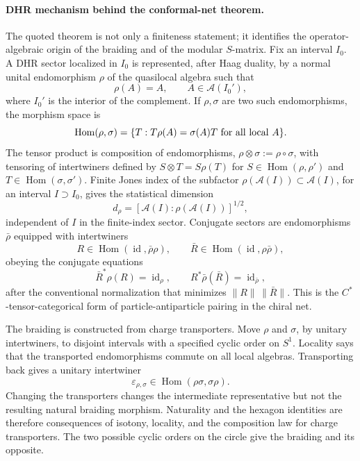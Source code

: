 \paragraph{DHR mechanism behind the conformal-net theorem.}
The quoted theorem is not only a finiteness statement; it identifies the
operator-algebraic origin of the braiding and of the modular \(S\)-matrix.
Fix an interval \(I_0\).  A DHR sector localized in \(I_0\) is represented,
after Haag duality, by a normal unital endomorphism \(\rho\) of the
quasilocal algebra such that
\begin{equation}
  \rho(A)=A,\qquad A\in\mathcal A(I_0'),
  \label{eq:dhr-localized-endomorphism}
\end{equation}
where \(I_0'\) is the interior of the complement.  If \(\rho,\sigma\) are
two such endomorphisms, the morphism space is
\begin{equation}
  \operatorname{Hom}(\rho,\sigma)
  =
  \{T:T\rho(A)=\sigma(A)T\ {\rm for\ all\ local}\ A\}.
  \label{eq:dhr-intertwiner-space}
\end{equation}
The tensor product is composition of endomorphisms,
\(\rho\otimes\sigma:=\rho\circ\sigma\), with tensoring of intertwiners
defined by \(S\otimes T=S\rho(T)\) for
\(S\in\operatorname{Hom}(\rho,\rho')\) and
\(T\in\operatorname{Hom}(\sigma,\sigma')\).  Finite Jones index of the
subfactor \(\rho(\mathcal A(I))\subset\mathcal A(I)\), for an interval
\(I\supset I_0\), gives the statistical dimension
\begin{equation}
  d_\rho
  =
  [\mathcal A(I):\rho(\mathcal A(I))]^{1/2},
  \label{eq:dhr-statistical-dimension-index}
\end{equation}
independent of \(I\) in the finite-index sector.  Conjugate sectors are
endomorphisms \(\bar\rho\) equipped with intertwiners
\[
  R\in\operatorname{Hom}(\operatorname{id},\bar\rho\rho),
  \qquad
  \bar R\in\operatorname{Hom}(\operatorname{id},\rho\bar\rho),
\]
obeying the conjugate equations
\begin{equation}
  \bar R^*\rho(R)=\operatorname{id}_\rho,
  \qquad
  R^*\bar\rho(\bar R)=\operatorname{id}_{\bar\rho},
  \label{eq:dhr-conjugate-equations}
\end{equation}
after the conventional normalization that minimizes
\(\|R\|\,\|\bar R\|\).  This is the \(C^*\)-tensor-categorical form of
particle-antiparticle pairing in the chiral net.

The braiding is constructed from charge transporters.  Move \(\rho\) and
\(\sigma\), by unitary intertwiners, to disjoint intervals with a specified
cyclic order on \(S^1\).  Locality says that the transported
endomorphisms commute on all local algebras.  Transporting back gives a
unitary intertwiner
\begin{equation}
  \varepsilon_{\rho,\sigma}
  \in
  \operatorname{Hom}(\rho\sigma,\sigma\rho).
  \label{eq:dhr-braiding-intertwiner}
\end{equation}
Changing the transporters changes the intermediate representative but not
the resulting natural braiding morphism.  Naturality and the hexagon
identities are therefore consequences of isotony, locality, and the
composition law for charge transporters.  The two possible cyclic orders on
the circle give the braiding and its opposite.

